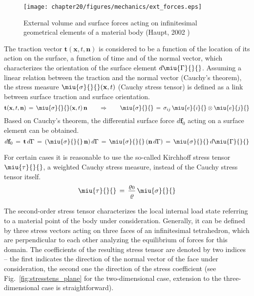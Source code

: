 \begin{figure}[htb!]
\begin{center}
\footnotesize
\texttt{[image: chapter20/figures/mechanics/ext\_forces.eps]}
\caption{External volume and surface forces acting on infinitesimal geometrical elements of a material body (Haupt, 2002 \cite{Haupt:2002})}
\label{fig:ext_forces}
\end{center}
\end{figure}

The traction vector $\mathbf{t}(\mathbf{x},t,\mathbf{n})$ is considered to be a function of the location of its action on the surface, a function of time and of the normal vector, which characterizes the orientation of the surface element $d\miu{\Gamma}{}{}$. Assuming a linear relation between the traction and the normal vector (Cauchy's theorem), the stress measure $\miu{\sigma}{}{}(\mathbf{x},t)$ (Cauchy stress tensor) is defined as a link between surface traction and surface orientation. 
\begin{equation}
\mathbf{t}(\mathbf{x},t,\mathbf{n})\,=\,\miu{\sigma}{}{}(\mathbf{x},t)\,\mathbf{n}
\qquad\Rightarrow\qquad
\miu{\sigma}{}{}\,=\,\sigma_{ij}\,\miu{e}{i}{}\otimes\miu{e}{j}{}
\label{eq:cauchy_theorem}
\end{equation}
Based on Cauchy's theorem, the differential surface force $d\mathbf{f}_0$ acting on a surface element can be obtained. 
\begin{equation}
d\mathbf{f}_0\,=\,\mathbf{t}\,d\Gamma\,=\,(\miu{\sigma}{}{}\,\mathbf{n})\,d\Gamma\,=\,
\miu{\sigma}{}{}\,(\mathbf{n}\,d\Gamma)\,=\,\miu{\sigma}{}{}\,d\miu{\Gamma}{}{}
\label{eq:differ_surforce}
\end{equation}

For certain cases it is reasonable to use the so-called Kirchhoff stress tensor $\miu{\tau}{}{}$, a weighted Cauchy stress measure, instead of the Cauchy stress tensor itself.
\begin{equation}
\miu{\tau}{}{}\,=\,\frac{\varrho_0}{\varrho}\,\miu{\sigma}{}{}
\end{equation}

The second-order stress tensor characterizes the local internal load state referring to a material point of the body under consideration. Generally, it can be defined by three stress vectors acting on three faces of an infinitesimal tetrahedron, which are perpendicular to each other analyzing the equilibrium of forces for this domain. The coefficients of the resulting stress tensor are denoted by two indices -- the first indicates the direction of the normal vector of the face under consideration, the second one the direction of the stress coefficient (see Fig.~\ref{fig:stresstens_plane} for the two-dimensional case, extension to the three-dimensional case is straightforward).

